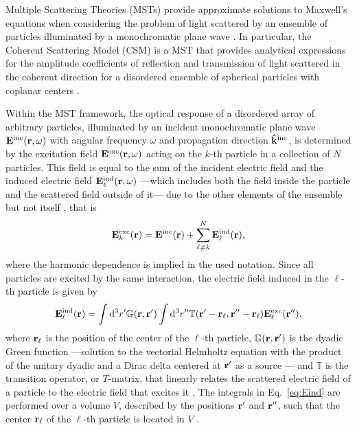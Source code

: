 
Multiple Scattering Theories (MSTs) provide approximate solutions to Maxwell's equations when considering the problem of light scattered by an ensemble of particles illuminated by a monochromatic plane wave \cite{loiko_monolayers_1998,reyes2018analytical}. In particular, the Coherent Scattering Model (CSM) is a MST that provides analytical expressions for the amplitude coefficients of reflection and transmission of light scattered in the coherent direction for a disordered ensemble of spherical particles with coplanar centers \cite{barrera_coherent_2003,garcia2012multiple,reyes2018analytical}. 

Within the MST framework, the optical response of a disordered array of arbitrary particles, illuminated by an incident monochromatic plane wave $\vb{E}^\text{inc}(\vb{r},\omega)$ with angular frequency $\omega$ and propagation direction $\vu{k}^\text{inc}$, is determined by the excitation field $\vb{E}^\text{exc}(\vb{r},\omega)$ acting on the $k$-th particle in a collection of $N$ particles. This field is equal to the sum of the incident electric field and the induced electric field $\vb{E}^\text{ind}_\ell(\vb{r},\omega)$ ---which includes both the field inside the particle and the scattered field outside of it--- due to the other elements of the ensemble but not itself \cite{garcia2012multiple,barrera_coherent_2003}, that is
%
\begin{align}
	\vb{E}^\text{exc}_k(\vb{r}) = \vb{E}^\text{inc}(\vb{r}) + \sum_{\ell\neq k}^N \vb{E}^\text{ind}_\ell(\vb{r}),
	\label{eq:Eexc}
\end{align}
%
where the harmonic dependence is implied in the used notation. Since all particles are excited by the same interaction, the electric field induced in the $\ell$-th particle is given by \cite{garcia2012multiple,barrera_coherent_2003}
%
\begin{align}
	\vb{E}^\text{ind}_\ell(\vb{r}) =
	\int\dd^3 r' \mathbb{G}(\vb{r},\vb{r}')
	\int\dd^3 r''\mathbb{T}(\vb{r}'-\vb{r}_\ell,\vb{r}''-\vb{r}_\ell) \vb{E}_\ell^\text{exc}(\vb{r}''),
	\label{eq:Eind}
\end{align}
%
where $\vb{r}_\ell$ is the position of the center of the $\ell$-th particle, $\mathbb{G}(\vb{r},\vb{r}')$ is the dyadic Green function ---solution to the vectorial Helmholtz equation with the product of the unitary dyadic and a Dirac delta centered at $\vb{r}'$ as a source \cite{tsang_scattering_2000}--- and $\mathbb{T}$ is the transition operator, or $T$-matrix, that linearly relates the scattered electric field of a particle to the electric field that excites it \cite{tsang_scattering_2000}. The integrals in Eq.~\eqref{eq:Eind} are performed over a  volume $V$, described by the positions $\vb{r}'$ and $\vb{r}''$, such that the center $\vb{r}_\ell$ of the $\ell$-th particle is located in $V$ \cite{barrera_coherent_2003}.

